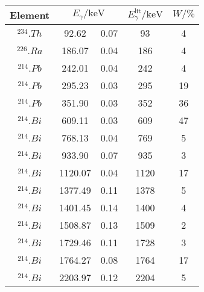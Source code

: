 \label{tab:unbekannt2}
	\begin{tabular}{cS[table-format=4.2]@{${}\pm{}$}S[table-format=1.2]S[table-format=4.0]S[table-format=2.0]}
		\toprule
		{Element} &  & {$E_\gamma^{\text{lit}}/\si{\kilo\electronvolt}$} & {$W/\si{\percent}$} \\
		\midrule
		{$^{234}.{Th}$} & 92.62   & 0.07 &   93 &  4 \\
		{$^{226}.{Ra}$} & 186.07  & 0.04 &  186 &  4 \\
		{$^{214}.{Pb}$} & 242.01  & 0.04 &  242 &  4 \\
		{$^{214}.{Pb}$} & 295.23  & 0.03 &  295 & 19 \\
		{$^{214}.{Pb}$} & 351.90  & 0.03 &  352 & 36 \\
		{$^{214}.{Bi}$} & 609.11  & 0.03 &  609 & 47 \\
		{$^{214}.{Bi}$} & 768.13  & 0.04 &  769 &  5 \\
		{$^{214}.{Bi}$} & 933.90  & 0.07 &  935 &  3 \\
		{$^{214}.{Bi}$} & 1120.07 & 0.04 & 1120 & 17 \\
		{$^{214}.{Bi}$} & 1377.49 & 0.11 & 1378 &  5 \\
		{$^{214}.{Bi}$} & 1401.45 & 0.14 & 1400 &  4 \\
		{$^{214}.{Bi}$} & 1508.87 & 0.13 & 1509 &  2 \\
		{$^{214}.{Bi}$} & 1729.46 & 0.11 & 1728 &  3 \\
		{$^{214}.{Bi}$} & 1764.27 & 0.08 & 1764 & 17 \\
		{$^{214}.{Bi}$} & 2203.97 & 0.12 & 2204 &  5 \\
		\bottomrule
	\end{tabular}
